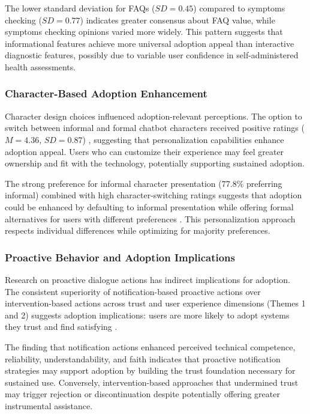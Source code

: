 \documentclass[manuscript,anonymous,sigconf]{acmart}
\begin{document}
The lower standard deviation for FAQs ($SD = 0.45$) compared to symptoms checking ($SD = 0.77$) indicates greater consensus about FAQ value, while symptoms checking opinions varied more widely. This pattern suggests that informational features achieve more universal adoption appeal than interactive diagnostic features, possibly due to variable user confidence in self-administered health assessments.

\subsubsection{Character-Based Adoption Enhancement}

Character design choices influenced adoption-relevant perceptions. The option to switch between informal and formal chatbot characters received positive ratings ($M = 4.36$, $SD = 0.87$) \cite{A79}, suggesting that personalization capabilities enhance adoption appeal. Users who can customize their experience may feel greater ownership and fit with the technology, potentially supporting sustained adoption.

The strong preference for informal character presentation (77.8\% preferring informal) combined with high character-switching ratings suggests that adoption could be enhanced by defaulting to informal presentation while offering formal alternatives for users with different preferences \cite{A79}. This personalization approach respects individual differences while optimizing for majority preferences.

\subsubsection{Proactive Behavior and Adoption Implications}

Research on proactive dialogue actions has indirect implications for adoption. The consistent superiority of notification-based proactive actions over intervention-based actions across trust and user experience dimensions (Themes 1 and 2) suggests adoption implications: users are more likely to adopt systems they trust and find satisfying \cite{A16}.

The finding that notification actions enhanced perceived technical competence, reliability, understandability, and faith \cite{A16} indicates that proactive notification strategies may support adoption by building the trust foundation necessary for sustained use. Conversely, intervention-based approaches that undermined trust may trigger rejection or discontinuation despite potentially offering greater instrumental assistance.
\end{document}
